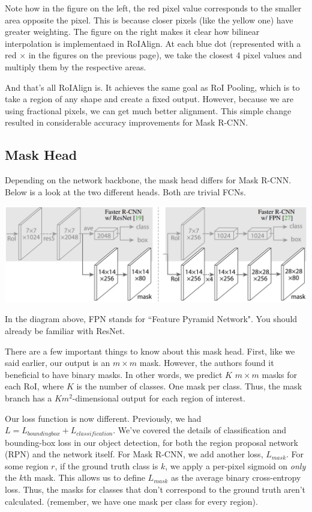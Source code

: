 Note how in the figure on the left, the red pixel value corresponds to the smaller area opposite the pixel. This is because closer pixels (like the yellow one) have greater weighting.
The figure on the right makes it clear how bilinear interpolation is implementaed in RoIAlign. At each blue dot (represented with a red $\times$ in the figures on the previous page), we take the closest 4 pixel values and multiply them by the respective areas.

And that's all RoIAlign is. It achieves the same goal as RoI Pooling, which is to take a region of any shape and create a fixed output. However, because we are using fractional pixels, we can get much better alignment. This simple change resulted in considerable accuracy improvements for Mask R-CNN.

\subsection{Mask Head}
Depending on the network backbone, the mask head differs for Mask R-CNN. Below is a look at the two different heads. Both are trivial FCNs.

\begin{center}
	\includegraphics[scale=0.3]{images/backbones.PNG}
\end{center}

In the diagram above, FPN stands for ``Feature Pyramid Network". You should already be familiar with ResNet.

There are a few important things to know about this mask head. First, like we said earlier, our output is an $m\times m$ mask. However, the authors found it beneficial to have binary masks. In other words, we predict $K$ $m\times m$ masks for each RoI, where $K$ is the number of classes. One mask per class. Thus, the mask branch has a $Km^2$-dimensional output for each region of interest.

Our loss function is now different. Previously, we had $L = L_{boundingbox} + L_{classification}$. We've covered the details of classification and bounding-box loss in our object detection, for both the region proposal network (RPN) and the network itself. For Mask R-CNN, we add another loss, $L_{mask}$. For some region $r$, if the ground truth class is $k$, we apply a per-pixel sigmoid on \textit{only} the $k$th mask. This allows us to define $L_{mask}$ as the average binary cross-entropy loss. Thus, the masks for classes that don't correspond to the ground truth aren't calculated. (remember, we have one mask per class for every region).

